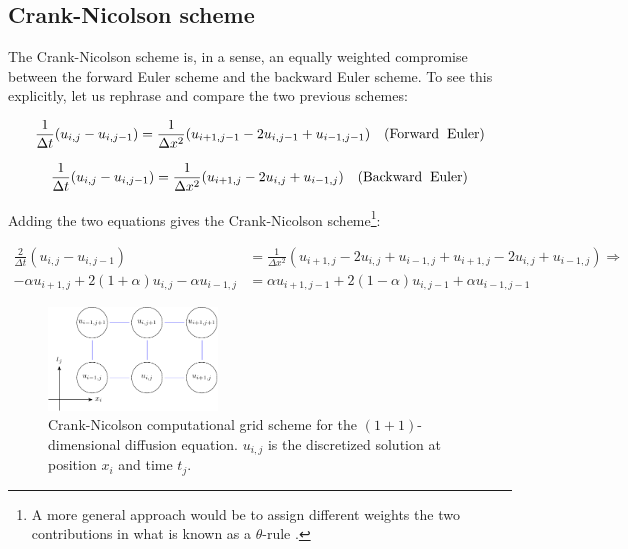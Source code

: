 \documentclass[a4paper, 11pt, notitlepage,english]{article}
\begin{document}
\subsection{Crank-Nicolson scheme}
The Crank-Nicolson scheme is, in a sense, an equally weighted compromise between the forward Euler scheme and the backward Euler scheme. To see this explicitly, let us rephrase and compare the two previous schemes:

\begin{equation}
 \frac{1}{\Delta t} (u_{i,j}-u_{i,j-1}) = \frac{1}{\Delta x^2} (u_{i+1,j-1}-2u_{i,j-1}+u_{i-1,j-1}) \hspace{10pt} \mathrm{(Forward \hspace{2mm} Euler)}
\end{equation}

\begin{equation}
 \frac{1}{\Delta t} (u_{i,j}-u_{i,j-1}) = \frac{1}{\Delta x^2} (u_{i+1,j}-2u_{i,j}+u_{i-1,j}) \hspace{10pt} \mathrm{(Backward \hspace{2mm} Euler)}
\end{equation}

Adding the two equations gives the Crank-Nicolson scheme\footnote{A more general approach would be to assign different weights the two contributions in what is known as a $\theta$-rule \cite{Komp3150}.}:

\begin{align}
\frac{2}{\Delta t} (u_{i,j}-u_{i,j-1}) &= \frac{1}{\Delta x^2} (u_{i+1,j}-2u_{i,j}+u_{i-1,j}+u_{i+1,j}-2u_{i,j}+u_{i-1,j} ) \Rightarrow \\
 -\alpha u_{i+1,j} + 2(1+\alpha)u_{i,j} -\alpha u_{i-1,j} &= \alpha u_{i+1,j-1} + 2(1-\alpha) u_{i,j-1} + \alpha u_{i-1,j-1}
\label{eq:Crank_Nicoloson_scheme}
\end{align}

\begin{figure}[h!tb]
 \centering
 \includegraphics[width=0.4\textwidth]{Grid_CN-figure0}
 \caption{Crank-Nicolson computational grid scheme for the $(1+1)$-dimensional diffusion equation. $u_{i,j}$ is the discretized solution at position $x_i$ and time $t_j$.}
 \label{fig:CN_grid}
\end{figure}
\end{document}
